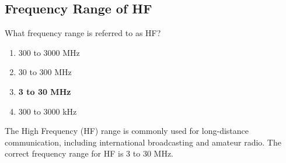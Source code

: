 \subsection{Frequency Range of HF}
\label{T3B10}

\begin{tcolorbox}[colback=gray!10!white,colframe=black!75!black,title=T3B10]
What frequency range is referred to as HF?
\begin{enumerate}[noitemsep]
    \item 300 to 3000 MHz
    \item 30 to 300 MHz
    \item \textbf{3 to 30 MHz}
    \item 300 to 3000 kHz
\end{enumerate}
\end{tcolorbox}

The High Frequency (HF) range is commonly used for long-distance communication, including international broadcasting and amateur radio. The correct frequency range for HF is 3 to 30 MHz.